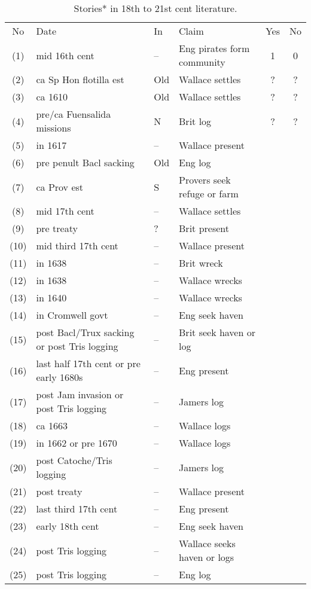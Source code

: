 \begin{table} %
\caption{Stories* in 18th to 21st cent literature.}
\label{tab:literature}
\begin{sideways}
\begin{tabular}{cp{.4\textheight}lp{.3\textheight}cc}
No	&Date	&In	&Claim	&Yes	&No\\
(1)	&mid 16th cent	&--	&Eng pirates form community	&1	&0\\ %
(2)	&ca Sp Hon flotilla est	&Old	&Wallace settles	&?	&?\\ %
(3)	&ca 1610	&Old&Wallace settles	&?	&?\\ %
(4)	&pre/ca Fuensalida missions	&N	&Brit log	&?	&?\\ %
(5)	&in 1617	&--	&Wallace present&&\\ %
(6)	&pre penult Bacl sacking	&Old	&Eng log	&&\\ %
(7)	&ca Prov est	&S	&Provers seek refuge or farm	&&\\ %
(8)	&mid 17th cent	&--	&Wallace settles	&&\\ %
(9)	&pre treaty	&?	&Brit present	&&\\ %
(10)	&mid third 17th cent	&--	&Wallace present	&&\\ %
(11)	&in 1638	&--	&Brit wreck	&&\\ %
(12)	&in 1638	&--	&Wallace wrecks	&&\\ %
(13)	&in 1640	&--	&Wallace wrecks	&&\\ %
(14)	&in Cromwell govt	&--	&Eng seek haven	&&\\ %
(15)	&post Bacl/Trux sacking or post Tris logging	&--	&Brit seek haven or log	&&\\ %
(16)	&last half 17th cent or pre early 1680s	&--	&Eng present	&&\\ %
(17)	&post Jam invasion or post Tris logging	&--	&Jamers log	&&\\ %
(18)	&ca 1663	&--	&Wallace logs	&&\\ %
(19)	&in 1662	 or pre 1670&--	&Wallace logs	&&\\ %
(20)	&post Catoche/Tris logging	&--	&Jamers log	&&\\ %
(21)	&post treaty	&--	&Wallace present	&&\\ %
(22)	&last third 17th cent	&--	&Eng present	&&\\ %
(23)	&early 18th cent	&--	&Eng seek haven	&&\\ %
(24)	&post Tris logging	&--	&Wallace seeks haven or logs	&&\\ %
(25)	&post Tris logging	&--	&Eng log	&& %
\end{tabular}
\end{sideways}
\end{table}
%

